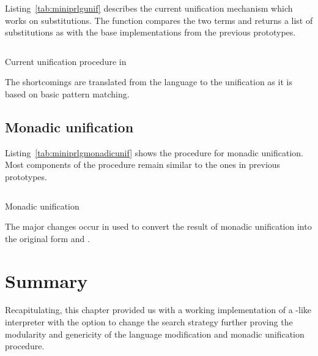 \documentclass[thesis-solanki.tex]{files}
\begin{document}
Listing~\ref{tab:miniprlgunif} describes the current unification mechanism which works on substitutions.
The  function compares the two terms and returns a list of substitutions as with the base
implementations from the previous prototypes.

\begin{code-list}[H]
\begin{singlespace}
  \inputminted[linenos, firstline=67, lastline=95]{haskell}{haskell-proto3-pentyl-skater.hs}
\end{singlespace}
\caption{Current unification procedure in  \cite{website:mini-prolog-hugs98}}
\label{tab:miniprlgunif}
\end{code-list}

The shortcomings are translated from the language to the unification as it is based on basic pattern matching.

\subsection{Monadic unification}
Listing~\ref{tab:miniprlgmonadicunif} shows the procedure for monadic unification. Most components of the procedure remain similar to the ones
in previous prototypes.
\begin{code-list}[H]
\begin{singlespace}
  \inputminted[linenos, firstline=1, lastline=42]{haskell}{haskell-proto3-bevy-icebox.hs}
\end{singlespace}
\caption{Monadic unification}
\label{tab:miniprlgmonadicunif}
\end{code-list}

The major changes occur in  used to convert the result of monadic unification into
the original  form and .

\section{Summary}
Recapitulating, this chapter provided us with a working implementation of a -like interpreter with
the option to change the search strategy further proving the modularity and genericity of the language modification
and monadic unification procedure.
\end{document}
